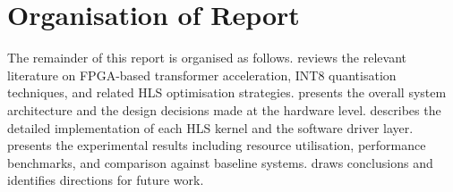 


\section{Organisation of Report}
\label{sec:organisation}

The remainder of this report is organised as follows.
 reviews the relevant literature on FPGA-based
transformer acceleration, INT8 quantisation techniques, and related HLS
optimisation strategies.  presents the overall system
architecture and the design decisions made at the hardware level.
 describes the detailed implementation of each HLS
kernel and the software driver layer.  presents the
experimental results including resource utilisation, performance benchmarks,
and comparison against baseline systems.  draws
conclusions and identifies directions for future work.
